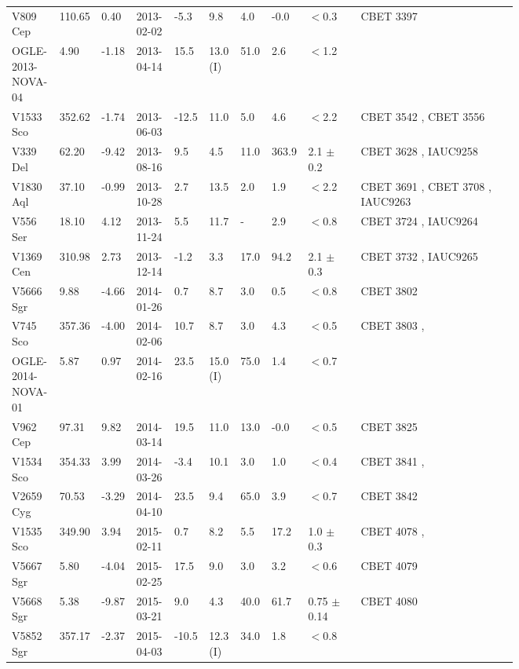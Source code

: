 \documentclass{aa} %
\begin{document}
\begin{landscape}
\begin{tiny}
\begin{longtable*}{ L{0.07\linewidth} p{0.03\linewidth}  p{0.04\linewidth} p{0.07\linewidth} p{0.03\linewidth} p{0.04\linewidth} p{0.04\linewidth} p{0.03\linewidth} p{0.1\linewidth}  L{0.3\linewidth} }
V809 Cep & 110.65 & 0.40 & 2013-02-02 & -5.3 & 9.8 & 4.0 & -0.0 & $<$0.3 & CBET 3397 \citep{CBET3397}\\
OGLE-2013-NOVA-04 & 4.90 & -1.18 & 2013-04-14 & 15.5 & 13.0 (I) & 51.0 & 2.6 & $<$1.2 & \citep{OGLEREF2}\\
V1533 Sco & 352.62 & -1.74 & 2013-06-03 & -12.5 & 11.0 & 5.0 & 4.6 & $<$2.2 & CBET 3542 \citep{CBET3542}, CBET 3556 \citep{CBET3556}\\
V339 Del & 62.20 & -9.42 & 2013-08-16 & 9.5 & 4.5 & 11.0 & 363.9 & 2.1 $\pm$ 0.2 & CBET 3628 \citep{CBET3628}, IAUC9258 \citep{IAUC9258}\\
V1830 Aql & 37.10 & -0.99 & 2013-10-28 & 2.7 & 13.5 & 2.0 & 1.9 & $<$2.2 & CBET 3691 \citep{CBET3691}, CBET 3708 \citep{CBET3708}, IAUC9263 \citep{IAUC9263}\\
V556 Ser & 18.10 & 4.12 & 2013-11-24 & 5.5 & 11.7 & - & 2.9 & $<$0.8 & CBET 3724 \citep{CBET3724}, IAUC9264 \citep{IAUC9264}\\
V1369 Cen & 310.98 & 2.73 & 2013-12-14 & -1.2 & 3.3 & 17.0 & 94.2 & 2.1 $\pm$ 0.3 & CBET 3732 \citep{CBET3732}, IAUC9265 \citep{IAUC9265}\\
V5666 Sgr & 9.88 & -4.66 & 2014-01-26 & 0.7 & 8.7 & 3.0 & 0.5 & $<$0.8 & CBET 3802 \citep{CBET3802}\\
V745 Sco & 357.36 & -4.00 & 2014-02-06 & 10.7 & 8.7 & 3.0 & 4.3 & $<$0.5 & CBET 3803 \citep{CBET3803},\citep{ OGLEREF1}\\
OGLE-2014-NOVA-01 & 5.87 & 0.97 & 2014-02-16 & 23.5 & 15.0 (I) & 75.0 & 1.4 & $<$0.7 & \citep{OGLEREF2}\\
V962 Cep & 97.31 & 9.82 & 2014-03-14 & 19.5 & 11.0 & 13.0 & -0.0 & $<$0.5 & CBET 3825 \citep{CBET3825}\\
V1534 Sco & 354.33 & 3.99 & 2014-03-26 & -3.4 & 10.1 & 3.0 & 1.0 & $<$0.4 & CBET 3841 \citep{CBET3841},\citep{2017MNRAS.469.4341M}\\
V2659 Cyg & 70.53 & -3.29 & 2014-04-10 & 23.5 & 9.4 & 65.0 & 3.9 & $<$0.7 & CBET 3842 \citep{CBET3842}\\
V1535 Sco & 349.90 & 3.94 & 2015-02-11 & 0.7 & 8.2 & 5.5 & 17.2 & 1.0 $\pm$ 0.3 & CBET 4078 \citep{CBET4078},\citep{2017MNRAS.469.4341M}\\
V5667 Sgr & 5.80 & -4.04 & 2015-02-25 & 17.5 & 9.0 & 3.0 & 3.2 & $<$0.6 & CBET 4079 \citep{CBET4079}\\
V5668 Sgr & 5.38 & -9.87 & 2015-03-21 & 9.0 & 4.3 & 40.0 & 61.7 & 0.75 $\pm$ 0.14 & CBET 4080 \citep{CBET4080}\\
V5852 Sgr & 357.17 & -2.37 & 2015-04-03 & -10.5 & 12.3 (I) & 34.0 & 1.8 & $<$0.8 & \citep{OGLEREF3}\\

\end{longtable*}
\end{tiny}
\end{landscape}
\end{document}
